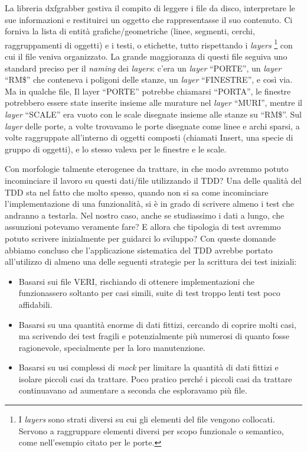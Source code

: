 \documentclass[12pt]{report}
\begin{document}
La libreria dxfgrabber gestiva il compito di leggere i file da disco, interpretare le sue informazioni e restituirci un oggetto che rappresentasse il suo contenuto. Ci forniva la lista di entità grafiche/geometriche (linee, segmenti, cerchi, raggruppamenti di oggetti) e i testi, o etichette, tutto rispettando i 
\textit{layers}
  \footnote{
    I \textit{layers} sono strati diversi su cui gli elementi del file vengono collocati. Servono a raggruppare elementi diversi per scopo funzionale o semantico, come nell'esempio citato per le porte.
  }
con cui il file veniva organizzato. La grande maggioranza di questi file seguiva uno standard preciso per il \textit{naming} dei \textit{layers}: c'era un \textit{layer} ``PORTE'', un \textit{layer} ``RM\$'' che conteneva i poligoni delle stanze, un \textit{layer} ``FINESTRE'', e così via. Ma in qualche file, Il layer ``PORTE'' potrebbe chiamarsi ``PORTA'', le finestre potrebbero essere state inserite insieme alle murature nel \textit{layer} ``MURI'', mentre il \textit{layer} ``SCALE'' era vuoto con le scale disegnate insieme alle stanze su ``RM\$''. Sul \textit{layer} delle porte, a volte trovavamo le porte disegnate come linee e archi sparsi, a volte raggruppate all'interno di oggetti composti (chiamati Insert, una specie di gruppo di oggetti), e lo stesso valeva per le finestre e le scale. 

Con morfologie talmente eterogenee da trattare, in che modo avremmo potuto incominciare il lavoro su questi dati/file utilizzando il TDD? Una delle qualità del TDD sta nel fatto che molto spesso, quando non si sa come incominciare l'implementazione di una funzionalità, si è in grado di scrivere almeno i test che andranno a testarla. Nel nostro caso, anche se studiassimo i dati a lungo, che assunzioni potevamo veramente fare? E allora che tipologia di test avremmo potuto scrivere inizialmente per guidarci lo sviluppo? Con queste domande abbiamo concluso che l'applicazione sistematica del TDD avrebbe portato all'utilizzo di almeno una delle seguenti strategie per la scrittura dei test iniziali:

\begin{itemize}
  \item Basarsi sui file VERI, rischiando di ottenere implementazioni che funzionassero soltanto per casi simili, suite di test troppo lenti test poco affidabili.
  \item Basarsi su una quantità enorme di dati fittizi, cercando di coprire molti casi, ma scrivendo dei test fragili e potenzialmente più numerosi di quanto fosse ragionevole, specialmente per la loro manutenzione.
  \item Basarsi su usi complessi di \textit{mock} per limitare la quantità di dati fittizi e isolare piccoli casi da trattare. Poco pratico perché i piccoli casi da trattare continuavano ad aumentare a seconda che esploravamo più file.
\end{itemize}
\end{document}
